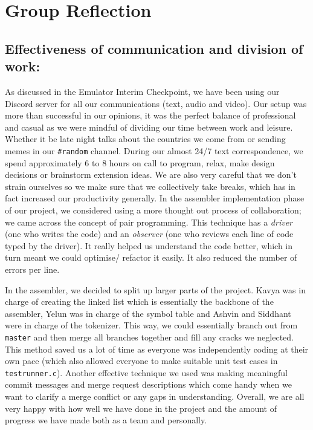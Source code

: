 \documentclass[a4paper]{article}
\begin{document}
\section{Group Reflection}
\subsection{Effectiveness of communication and division of work:}

As discussed in the Emulator Interim Checkpoint, we have been using our Discord server for all our communications (text, audio and video). Our setup was more than successful in our opinions, it was the perfect balance of professional and casual as we were mindful of dividing our time between work and leisure. Whether it be late night talks about the countries we come from or sending memes in our \verb|#random| channel. During our almost 24/7 text correspondence, we spend approximately 6 to 8 hours on call to program, relax, make design decisions or brainstorm extension ideas. We are also very careful that we don't strain ourselves so we make sure that we collectively take breaks, which has in fact increased our productivity generally. In the assembler implementation phase of our project, we considered using a more thought out process of collaboration; we came across the concept of pair programming. This technique has a \textit{driver} (one who writes the code) and an \textit{observer} (one who reviews each line of code typed by the driver). It really helped us understand the code better, which in turn meant we could optimise/ refactor it easily. It also reduced the number of errors per line.

In the assembler, we decided to split up larger parts of the project. Kavya was in charge of creating the linked list which is essentially the backbone of the assembler, Yelun was in charge of the symbol table and Ashvin and Siddhant were in charge of the tokenizer. This way, we could essentially branch out from \verb|master| and then merge all branches together and fill any cracks we neglected. This method saved us a lot of time as everyone was independently coding at their own pace (which also allowed everyone to make suitable unit test cases in \verb|testrunner.c|). Another effective technique we used was making meaningful commit messages and merge request descriptions which come handy when we want to clarify a merge conflict or any gaps in understanding. Overall, we are all very happy with how well we have done in the project and the amount of progress we have made both as a team and personally.
\end{document}

